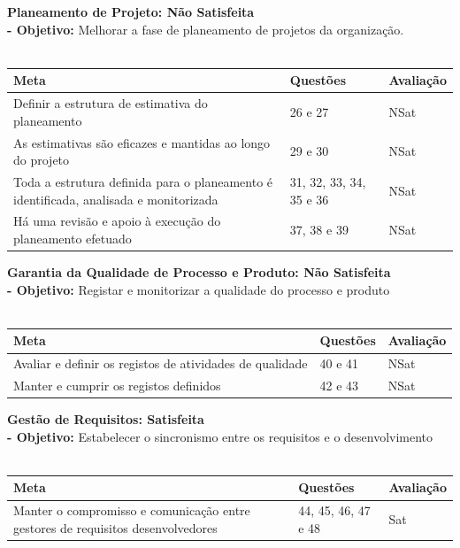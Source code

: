 \documentclass[openany,10pt,a4paper]{article}
\begin{document}
\textbf{Planeamento de Projeto: Não Satisfeita} \\ 
\textbf{- Objetivo:} Melhorar a fase de planeamento de projetos da organização. \\
\\
\begin{tabular}{|p{3.7in}|p{1in}|p{1in}|}\hline
\textbf{Meta} & \textbf{Questões} & \textbf{Avaliação} \\ \hline
Definir a estrutura de estimativa do planeamento & 26 e 27 & NSat \\
As estimativas são eficazes e mantidas ao longo do projeto & 29 e 30 & NSat \\
Toda a estrutura definida para o planeamento é identificada, analisada e monitorizada & 31, 32, 33, 34, 35 e 36 & NSat \\ 
Há uma revisão e apoio à execução do planeamento efetuado & 37, 38 e 39 & NSat \\ \hline
\end{tabular} 

\textbf{Garantia da Qualidade de Processo e Produto: Não Satisfeita} \\
\textbf{- Objetivo:} Registar e monitorizar a qualidade do processo e produto \\
\\
\begin{tabular}{|p{3.7in}|p{1in}|p{1in}|}	\hline
\textbf{Meta} & \textbf{Questões} & \textbf{Avaliação} \\ \hline
Avaliar e definir os registos de atividades de qualidade & 40 e 41 & NSat \\ 
Manter e cumprir os registos definidos & 42 e 43 & NSat \\ \hline
\end{tabular}

\textbf{Gestão de Requisitos: Satisfeita} \\
\textbf{- Objetivo:} Estabelecer o sincronismo entre os requisitos e o desenvolvimento \\
\\
\begin{tabular}{|p{3.7in}|p{1in}|p{1in}|}	\hline	
\textbf{Meta} & \textbf{Questões} & \textbf{Avaliação} \\ \hline
Manter o compromisso e comunicação entre gestores de requisitos desenvolvedores & 44, 45, 46, 47 e 48 & Sat \\ \hline
\end{tabular}
\end{document}
